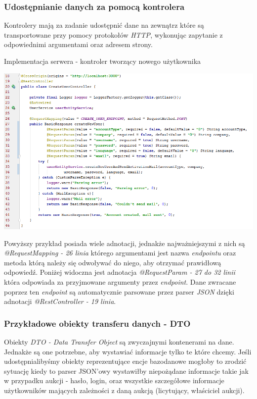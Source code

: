 \documentclass[10pt,titlepage]{article} %
\begin{document}
\subsubsection{Udostępnianie danych za pomocą kontrolera}
Kontrolery mają za zadanie udostępnić dane na zewnątrz które są transportowane przy pomocy protokołów \textit{HTTP}, wykonując zapytanie z odpowiednimi argumentami oraz adresem strony.

\begin{listing}[H]
\caption[Implementacja serwera - kontroler tworzący nowego użytkownika]{Implementacja serwera - kontroler tworzący nowego użytkownika}
\includegraphics[width=1.0\textwidth, height=0.5\textheight]{img/sekcja3/backend/kontrolerUzytkownik}
\end{listing}

Powyższy przykład posiada wiele adnotacji, jednakże najważniejszymi z nich są \textit{@RequestMapping - 26 linia} którego argumentami jest nazwa \textit{endpointu} oraz metoda którą należy się odwoływać do niego, aby otrzymać prawidłową odpowiedź. Poniżej widoczna jest adnotacja \textit{@RequestParam - 27 do 32 linii} która odpowiada za przyjmowane argumenty przez \textit{endpoint}.
Dane zwracane poprzez ten \textit{endpoint} są automatycznie parsowane przez parser \textit{JSON} dzięki adnotacji \textit{@RestController - 19 linia}. 


\subsubsection{Przykładowe obiekty transferu danych - DTO}
Obiekty \textit{DTO - Data Transfer Object} są zwyczajnymi kontenerami na dane. Jednakże są one potrzebne, aby wystawiać informacje tylko te które chcemy. Jeśli udostępnialibyśmy obiekty reprezentujące encje bazodanowe mogłoby to zrodzić sytuację kiedy to parser JSON'owy wystawiłby niepożądane informacje takie jak w przypadku aukcji - hasło, login, oraz wszystkie szczegółowe informacje użytkowników mających zależności z daną aukcją (licytujący, właściciel aukcji).
\end{document}
